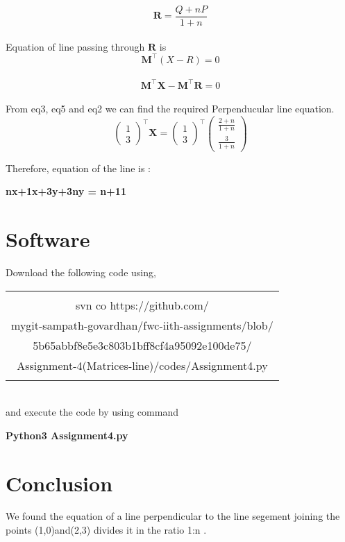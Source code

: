 \documentclass[journal,12pt,twocolumn]{article}
\newcommand{\myvec}[1]{\ensuremath{\begin{pmatrix}#1\end{pmatrix}}}
\let\vec\mathbf
\begin{document}
 \begin{equation}
	\vec{R}=\frac{Q+nP}{1+n}
	 \label{eq-4}
\end{equation}
 \\
Equation of line passing through ${\vec{R}}$ is\\
\begin{equation}
	\vec{M^{\top}}(X-R)=0
	 \label{eq-4}
\end{equation}
\\
\begin{equation}
	 \vec{M^{\top}}
	 \vec{X} - \vec{M^{\top}}
	 \vec{R} = 0
	 \label{eq-5}
\end{equation}
 \\
 From eq3, eq5 and eq2 we can find the required Perpenducular line equation. 
 \begin{equation}
	   \myvec{
  1\\
  3}^{\top}
	 \vec{X}
	 = \myvec{
  1\\
  3}^{\top}\myvec{
  \frac{2+n}{1+n}\\
  \frac{3}{1+n}} 
  \label{eq-5}
\end{equation}

Therefore, equation of the line is :
\begin{center}
    \textbf{nx+1x+3y+3ny = n+11}
\end{center}


 
\section{Software}
Download the following code using,
\begin{table}[h]
    \centering
    \begin{tabular}{|c|}
    \hline \\
         svn co https://github.com/\\mygit-sampath-govardhan/fwc-iith-assignments/blob/\\5b65abbf8e5e3c803b1bff8cf4a95092e100de75/\\Assignment-4(Matrices-line)/codes/Assignment4.py  \\
         \\
\hline
    \end{tabular}
\end{table}
\\
and execute the code by using command
\begin{center}
\textbf{Python3  Assignment4.py}\\
\end{center}

\section{Conclusion}
\begin{center}
We found the equation of a line perpendicular to the line segement joining the points (1,0)and(2,3) divides it in the ratio 1:n .
\end{center}
\end{document}
